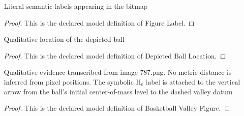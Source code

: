 \begin{definition}
  \label{def:physics:phyx-mini-0787:phyxminiproblems-problemphyxmini0787-figurelabel}
  Literal semantic labels appearing in the bitmap
\end{definition}
\begin{proof}
  This is the declared model definition of Figure Label.
\end{proof}
\begin{definition}
  \label{def:physics:phyx-mini-0787:phyxminiproblems-problemphyxmini0787-depictedballlocation}
  Qualitative location of the depicted ball
\end{definition}
\begin{proof}
  This is the declared model definition of Depicted Ball Location.
\end{proof}
\begin{definition}
  \label{def:physics:phyx-mini-0787:phyxminiproblems-problemphyxmini0787-basketballvalleyfigure}
  Qualitative evidence transcribed from image 787.png. No metric distance is inferred from pixel positions. The symbolic H₀ label is attached to the vertical arrow from the ball's initial center-of-mass level to the dashed valley datum
\end{definition}
\begin{proof}
  This is the declared model definition of Basketball Valley Figure.
\end{proof}
